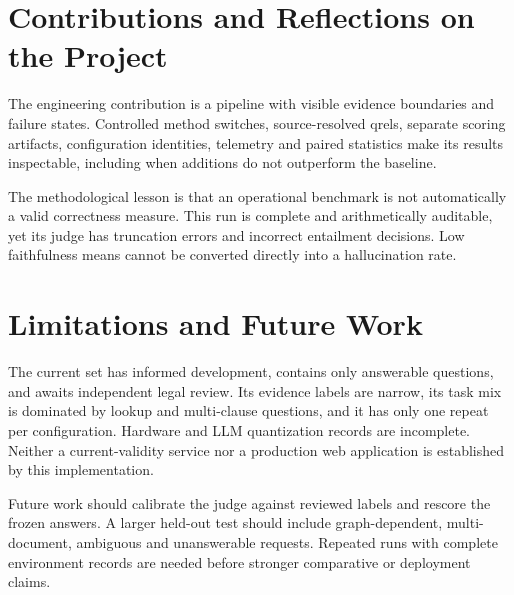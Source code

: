 \documentclass[11pt,a4paper,oneside]{report}
\begin{document}
\section{Contributions and Reflections on the Project}
The engineering contribution is a pipeline with visible evidence boundaries and failure states. Controlled method switches, source-resolved qrels, separate scoring artifacts, configuration identities, telemetry and paired statistics make its results inspectable, including when additions do not outperform the baseline.

The methodological lesson is that an operational benchmark is not automatically a valid correctness measure. This run is complete and arithmetically auditable, yet its judge has truncation errors and incorrect entailment decisions. Low faithfulness means cannot be converted directly into a hallucination rate.

\section{Limitations and Future Work}
The current set has informed development, contains only answerable questions, and awaits independent legal review. Its evidence labels are narrow, its task mix is dominated by lookup and multi-clause questions, and it has only one repeat per configuration. Hardware and LLM quantization records are incomplete. Neither a current-validity service nor a production web application is established by this implementation.

Future work should calibrate the judge against reviewed labels and rescore the frozen answers. A larger held-out test should include graph-dependent, multi-document, ambiguous and unanswerable requests. Repeated runs with complete environment records are needed before stronger comparative or deployment claims.
\end{document}

